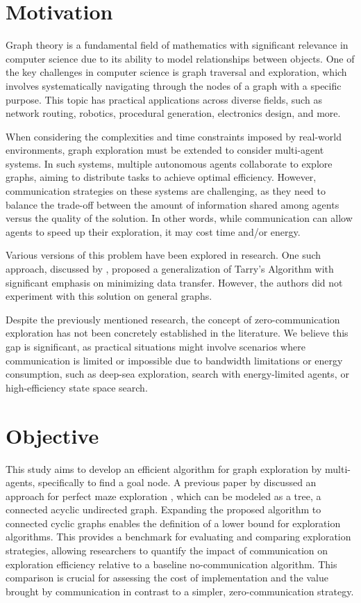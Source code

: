 \section{Motivation}
\label{section_intro_motivation}

Graph theory is a fundamental field of mathematics with significant relevance in
computer science due to its ability to model relationships between objects.
One of the key challenges in computer science is graph traversal and exploration, which involves systematically navigating through the nodes of a graph
with a specific purpose. This topic has practical applications across diverse fields, such as network routing, robotics, procedural generation, electronics design, and more.

When considering the complexities and time constraints imposed by real-world environments,
graph exploration must be extended to consider multi-agent systems. In such systems, multiple
autonomous agents collaborate to explore graphs, aiming to distribute tasks to achieve optimal efficiency. However, communication strategies
on these systems are challenging, as they need to balance the trade-off between the amount of information shared among agents
versus the quality of the solution. In other words, while communication can allow
agents to speed up their exploration, it may cost time and/or energy.

Various versions of this problem have been explored in research. 
One such approach, discussed by , proposed a generalization of Tarry's Algorithm with significant emphasis on minimizing data transfer.
However, the authors did not experiment with this solution on general graphs.

Despite the previously mentioned research, the concept of zero-communication exploration has not been
concretely established in the literature. We believe this gap is significant, as practical situations might involve
scenarios where communication is limited or impossible due to bandwidth limitations or energy consumption, such as deep-sea exploration,
search with energy-limited agents, or high-efficiency state space search.

\section{Objective}
\label{section_intro_objective}

This study aims to develop an efficient algorithm for graph exploration by multi-agents, specifically to find a goal node.
A previous paper by  discussed an approach for perfect maze exploration \cite{Naeem2021}, which can be modeled as a tree, a connected acyclic undirected graph.
Expanding the proposed algorithm to connected cyclic graphs enables the definition of a lower bound for exploration algorithms. This provides a benchmark for evaluating and comparing exploration strategies, allowing researchers to quantify the impact of communication on exploration efficiency relative to a baseline no-communication algorithm. This comparison is crucial for assessing the cost of implementation and the value brought by communication in contrast to a simpler, zero-communication strategy.

